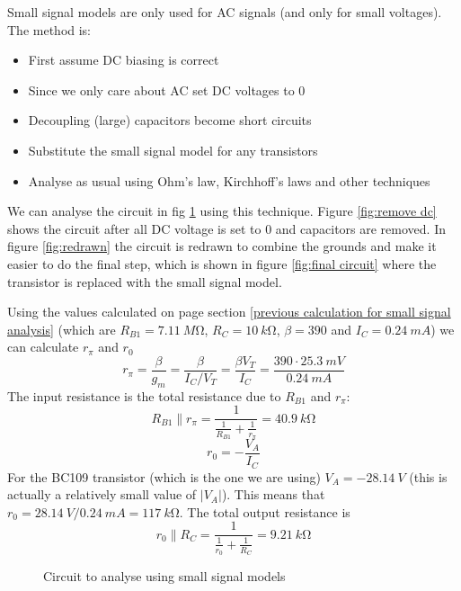 \documentclass{article}
\begin{document}
    Small signal models are only used for AC signals (and only for small voltages). The method is:
    \begin{itemize}
        \item First assume DC biasing is correct
        \item Since we only care about AC set DC voltages to 0
        \item Decoupling (large) capacitors become short circuits
        \item Substitute the small signal model for any transistors
        \item Analyse as usual using Ohm's law, Kirchhoff's laws and other techniques
    \end{itemize}

    \example
    We can analyse the circuit in fig \ref{fig:original circuit} using this technique. 
    Figure \ref{fig:remove dc} shows the circuit after all DC voltage is set to 0 and capacitors are removed. 
    In figure \ref{fig:redrawn} the circuit is redrawn to combine the grounds and make it easier to do the final step, 
    which is shown in figure \ref{fig:final circuit} where the transistor is replaced with the small signal model.
    
    Using the values calculated on page \pageref{previous calculation for small signal analysis} section \ref{previous calculation for small signal analysis} (which are \(R_{B1} = \SI{7.11}{M\ohm}\), \(R_C = \SI{10}{k\ohm}\), \(\beta = 390\) and \(I_C = \SI{0.24}{mA}\)) we can calculate \(r_\pi\) and \(r_0\)
    \[r_\pi = \frac{\beta}{g_m} = \frac{\beta}{I_C/V_T} = \frac{\beta V_T}{I_C} = \frac{390\cdot\SI{25.3}{mV}}{\SI{0.24}{mA}}\]
    The input resistance is the total resistance due to \(R_{B1}\) and \(r_\pi\):
    \[R_{B1}\parallel r_\pi = \frac{1}{\frac{1}{R_{B1}} + \frac{1}{r_\pi}} = \SI{40.9}{k\ohm}\]
    \[r_0=-\frac{V_A}{I_C}\]
    For the BC109 transistor (which is the one we are using) \(V_A = \SI{-28.14}{V}\) (this is actually a relatively small value of \(|V_A|\)). This means that \(r_0 = \SI{28.14}{V}/\SI{0.24}{mA} = \SI{117}{k\ohm}\). The total output resistance is
    \[r_0\parallel R_C = \frac{1}{\frac{1}{r_0} + \frac{1}{R_C}} = \SI{9.21}{k\ohm}\]
    
    \begin{figure}[ht]
        \centering
        \caption{Circuit to analyse using small signal models}
        \label{fig:original circuit}
    \end{figure}
\end{document}
